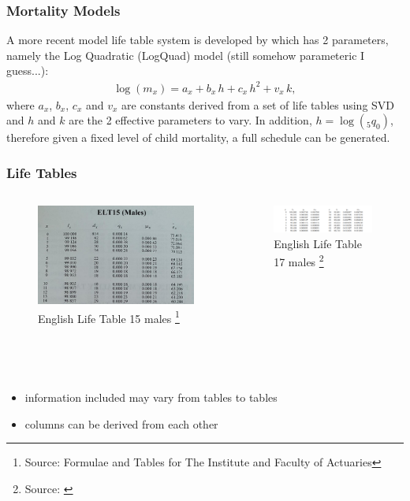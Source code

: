 \documentclass[hyperref={colorlinks, citecolor=blue}]{beamer}
\begin{document}
\begin{frame}
\frametitle{Mortality Models}
A more recent model life table system is developed by \citet{wilmoth2012flexible} which has 2 parameters, namely the Log Quadratic (LogQuad) model (still somehow parameteric I guess...):
\begin{align*}
\log(m_x) = a_x + b_x \, h + c_x \, h^2 + v_x \, k,
\end{align*}
where $a_x$, $b_x$, $c_x$ and $v_x$ are constants derived from a set of life tables using SVD and $h$ and $k$ are the 2 effective parameters to vary. In addition, $h = \log(_5q_0)$, therefore given a fixed level of child mortality, a full schedule can be generated.
\end{frame}

\begin{frame}
\frametitle{Life Tables}
\begin{columns}
\begin{figure}
\includegraphics[width=0.95\linewidth]{Graphs/ELT15 snap.jpeg}
\caption{English Life Table 15 males \footnote[frame]{Source: Formulae and Tables for The Institute and Faculty of Actuaries}}
\end{figure}
\begin{figure}
\includegraphics[width=1.2\linewidth]{Graphs/ELT17 males snap.png}
\caption{English Life Table 17 males \footnote[frame]{Source: \citet{dodd2018smoothing}}}
\end{figure}
\end{columns}
\\~\\
\begin{itemize}
\item information included may vary from tables to tables
\item columns can be derived from each other
\end{itemize}
\end{frame}
\end{document}
